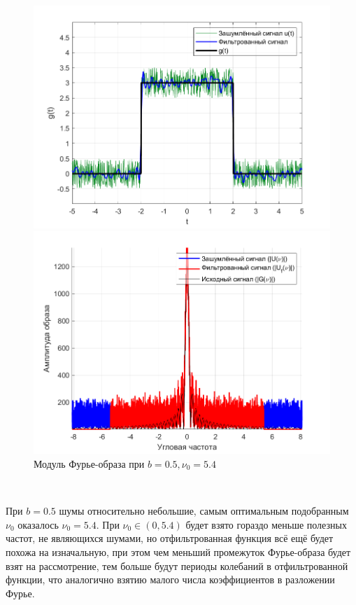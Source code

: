 \documentclass[a4paper]{article}
\begin{document}
\begin{figure}[H]
    \begin{minipage}{0.5\textwidth}
        \centering
        \includegraphics[width=\textwidth]{part1/0.5_5.4.png}
        \caption{$b=0.5, \nu_0 = 5.4$}
    \end{minipage}    
    \begin{minipage}{0.5\textwidth}
        \centering
        \includegraphics[width=\textwidth]{part1/0.5_5.4_Fourier.png}
        \caption{Модуль Фурье-образа при $b=0.5, \nu_0 = 5.4$}
    \end{minipage}
\end{figure}\ 

При $b = 0.5$ шумы относительно небольшие, самым оптимальным подобранным $\nu_0$ оказалось $\nu_0=5.4$. При $\nu_0 \in (0, 5.4)$ будет взято гораздо меньше полезных частот, не являющихся шумами, но отфильтрованная функция всё ещё будет похожа на изначальную, при этом чем меньший промежуток Фурье-образа будет взят на рассмотрение, тем больше будут периоды колебаний в отфильтрованной функции, что аналогично взятию малого числа коэффициентов в разложении Фурье.\ 
\end{document}
